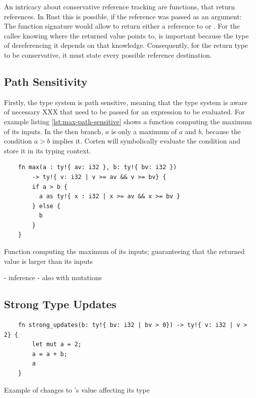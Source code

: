 \documentclass[twoside, english]{sdqthesis}
\theoremstyle{definition}
\begin{document}
An intricacy about conservative reference tracking are functions, that return references. In Rust this is possible, if the reference was passed as an argument: The function signature  would allow  to return either a reference to  or . For the callee knowing where the returned value points to, is important because the type of dereferencing it depends on that knowledge. Consequently, for the return type to be conservative, it must state every possible reference destination.


\label{subsec:path-sensitivify}\subsection{Path Sensitivity}

Firstly, the type system is path sensitive, meaning that the type system is aware of necessary XXX that need to be passed for an expression to be evaluated. For example listing \ref{lst:max-path-sensitive} shows a function computing the maximum of its inputs. In the then branch, $a$ is only a maximum of $a$ and $b$, because the condition $a > b$ implies it. Corten will symbolically evaluate the condition and store it in its typing context.

\begin{listing}[ht]
  \begin{verbatim}
    fn max(a : ty!{ av: i32 }, b: ty!{ bv: i32 })
        -> ty!{ v: i32 | v >= av && v >= bv} {
        if a > b {
          a as ty!{ x : i32 | x >= av && x >= bv }
        } else {
          b
        }
    }
  \end{verbatim}
  \caption{Function computing the maximum of its inputs; guaranteeing that the returned value is larger than its inputs}
  \label{lst:max-path-sensitive}
\end{listing}


- inference
- also with mutations


\label{subsec:strong-type-updates}\subsection{Strong Type Updates}

\begin{listing}[ht]
  \begin{verbatim}
    fn strong_updates(b: ty!{ bv: i32 | bv > 0}) -> ty!{ v: i32 | v > 2} {
        let mut a = 2;
        a = a + b;
        a
    }
  \end{verbatim}
  \caption{Example of changes to 's value affecting its type}
  \label{lst:strong-updates}
\end{listing}
\end{document}
